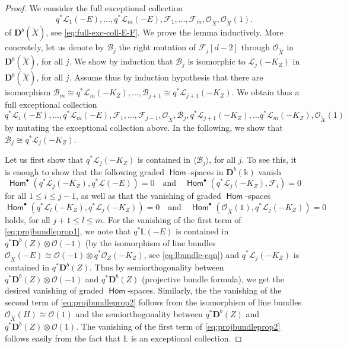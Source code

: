 \documentclass[a4paper,11pt, reqno]{amsart}
\def\L{\mathbb L}
\def\DD{\mathbf D}
\def\OO{\mathcal O}
\def\sB{\mathscr{B}}
\def\sF{\mathscr{F}}
\def\sL{\mathscr{L}}
\newcommand{\opname}[1]{\operatorname{\mathsf{#1}}}
\newcommand{\Hom}{\opname{Hom}}
\def\Db{\DD^b}
\theoremstyle{plain}
\theoremstyle{definition}
\numberwithin{equation}{section}
\begin{document}
\begin{proof}
We consider the full exceptional collection 
\[
   q^\ast \sL_1 ( -E )  , \ldots , q^\ast \sL_m ( -E ) ,  \sF_1 , \ldots , \sF_m , \OO_{\tilde{X}} ,  \OO_{\tilde X} (1) .
\]
of $\Db ( \tilde{X} )$, see \eqref{eq:full-exc-coll-E-F}.
We prove the lemma inductively.
More concretely, let us denote by $\sB_j$ the right mutation of $\sF_{j} [d-2]$ through $\OO_{\tilde{X}}$ in $\Db( \tilde{X})$, for all $j$.
We show by induction that $\sB_j $ is isomorphic to $\sL_j (-K_Z)$ in $\Db( \tilde{X} )$, for all $j$.
    Assume thus by induction hypothesis that there are isomorphism $ \sB_m \cong q^\ast \sL_m (-K_Z) , \ldots , \sB_{j+1} \cong q^\ast \sL_{j+1} (-K_Z)$.
    We obtain thus a full exceptional collection
    \[
     q^\ast \sL_1 ( -E )  , \ldots , q^\ast \sL_m ( -E ) ,  \sF_1 , \ldots , \sF_{j-1} , \OO_{\tilde{X}} , \sB_j , q^\ast \sL_{j+1} (-K_Z)  , \ldots  q^\ast \sL_m (-K_Z)  , \OO_{\tilde X} (1) 
    \]
     by mutating the exceptional collection above.
     In the following, we show that $\sB_j \cong q^\ast \sL_j (-K_Z)$.

    Let us first show that $q^\ast \sL_j (-K_Z)$ is contained in $\langle \sB_j\rangle $, for all $j$.
    To see this, it is enough to show that the following graded $\Hom$-spaces in $\Db(\mathbb{k})$ vanish
    \begin{equation}\label{eq:projbundleprop1}
        \Hom^\bullet ( q^\ast \sL_j (-K_Z) , q^\ast \sL ( -E ) ) = 0 \quad \text{and} \quad \Hom^\bullet ( q^\ast \sL_j (-K_Z) , \sF_i ) = 0
    \end{equation}    
    for all $1\leq i \leq j -1$,
    as well as that the vanishing of graded $\Hom $-spaces 
    \begin{equation}\label{eq:projbundleprop2}
        \Hom^\bullet ( q^\ast \sL_{l} (-K_Z) , q^\ast \sL_j (-K_Z) ) = 0 \quad \text{and} \quad \Hom^\bullet ( \OO_{\tilde X}(1) , q^\ast \sL_j (-K_Z) ) = 0
    \end{equation}
    holds,
    for all $j+1 \leq l\leq m$.
    For the vanishing of  
    the first term of \eqref{eq:projbundleprop1},
    we note that $q^\ast \L ( -E ) $ is contained in $q^\ast \Db(Z) \otimes \OO(-1)$ (by the isomorphism of line bundles $\OO_{\tilde{X}}(-E) \cong \OO(-1) \otimes q^\ast \OO_Z (-K_Z )$, see \eqref{eq:lbundle-eqn}) and $ q^\ast \sL_j (-K_Z)$ is contained in $q^\ast \Db(Z)$.
    Thus by semiorthogonality between $q^\ast \Db(Z) \otimes \OO(-1)$ and $q^\ast \Db(Z) $ (projective bundle formula), we get the desired vanishing of graded $\Hom$-spaces.
    Similarly, 
    the the vanishing of 
    the second term of \eqref{eq:projbundleprop2}
    follows from the isomorphism of line bundles $\OO_{\tilde{X}}(H) \cong \OO(1)$ and the semiorthogonality between $q^\ast \Db(Z)$ and $q^\ast \Db(Z) \otimes \OO(1)$.
    The vanishing of 
    the first term of \eqref{eq:projbundleprop2}
    follows easily from the fact that $\L$ is an exceptional collection.
    

\end{proof}
\end{document}
